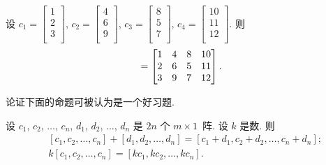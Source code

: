 \documentclass[../libro.tex]{subfiles}
\begin{document}
\begin{example}
    设
    \(c_1 =
        \begin{bmatrix}
            1 \\ 2 \\ 3 \\
    \end{bmatrix}\),
    \(c_2 =
        \begin{bmatrix}
            4 \\ 6 \\ 9 \\
    \end{bmatrix}\),
    \(c_3 =
        \begin{bmatrix}
            8 \\ 5 \\ 7 \\
    \end{bmatrix}\),
    \(c_4 =
        \begin{bmatrix}
            10 \\ 11 \\ 12 \\
    \end{bmatrix}\).
    则
    \begin{equation*}
        [c_1, c_2, c_3, c_4] =
        \begin{bmatrix}
            1 & 4 & 8 & 10 \\
            2 & 6 & 5 & 11 \\
            3 & 9 & 7 & 12 \\
        \end{bmatrix}.
        \qefhere
    \end{equation*}
\end{example}

论证下面的命题可被认为是一个好习题.

\begin{theorem}
    设
    \(c_1\), \(c_2\), \(\dots\), \(c_n\),
    \(d_1\), \(d_2\), \(\dots\), \(d_n\)
    是 \(2n\) 个 \(m \times 1\)~阵.
    设 \(k\) 是数.
    则
    \begin{align*}
        & [c_1, c_2, \dots, c_n] + [d_1, d_2, \dots, d_n]
        = [c_1 + d_1, c_2 + d_2, \dots, c_n + d_n]; \\
        & k[c_1, c_2, \dots, c_n]
        = [kc_1, kc_2, \dots, kc_n].
    \end{align*}
\end{theorem}
\end{document}
